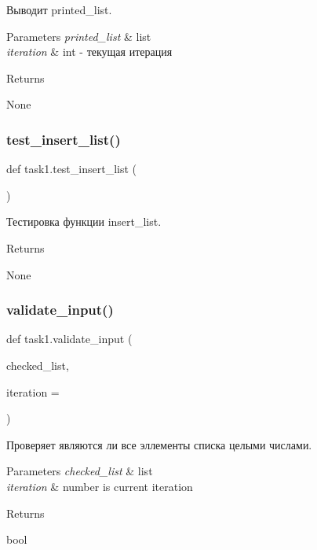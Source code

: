 Выводит printed\+\_\+list. 


\begin{DoxyParams}{Parameters}
{\em printed\+\_\+list} & list \\
\hline
{\em iteration} & int -\/ текущая итерация\\
\hline
\end{DoxyParams}
\begin{DoxyReturn}{Returns}


None 
\end{DoxyReturn}
\mbox{\label{namespacetask1_abf46b9cd1caf7517428f67ea6e3fd856}} 
\subsubsection{\texorpdfstring{test\+\_\+insert\+\_\+list()}{test\_insert\_list()}}
{\footnotesize\ttfamily def task1.\+test\+\_\+insert\+\_\+list (\begin{DoxyParamCaption}{ }\end{DoxyParamCaption})}



Тестировка функции insert\+\_\+list. 

\begin{DoxyReturn}{Returns}


None 
\end{DoxyReturn}
\mbox{\label{namespacetask1_a10a53eb0c0749f366289a43db9ce833f}} 
\subsubsection{\texorpdfstring{validate\+\_\+input()}{validate\_input()}}
{\footnotesize\ttfamily def task1.\+validate\+\_\+input (\begin{DoxyParamCaption}\item[{}]{checked\+\_\+list,  }\item[{}]{iteration = {} }\end{DoxyParamCaption})}



Проверяет являются ли все эллементы списка целыми числами. 


\begin{DoxyParams}{Parameters}
{\em checked\+\_\+list} & list \\
\hline
{\em iteration} & number is current iteration\\
\hline
\end{DoxyParams}
\begin{DoxyReturn}{Returns}


bool 
\end{DoxyReturn}
